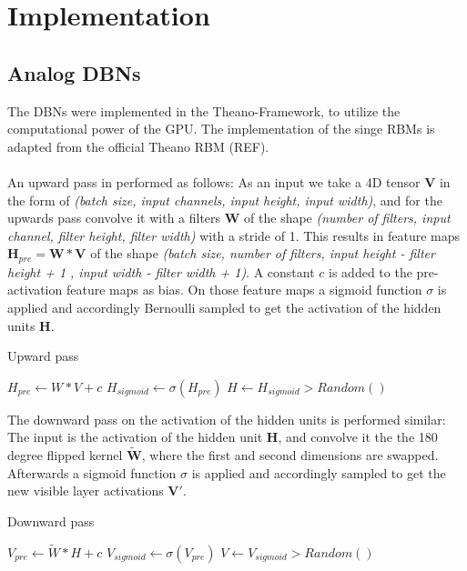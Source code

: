 \chapter{Implementation}


\section{Analog DBNs}

The DBNs were implemented in the Theano-Framework, to utilize the computational power of the GPU.
The implementation of the singe RBMs is adapted from the official Theano RBM (REF).
\\
\\
An upward pass in performed as follows:
As an input we take a 4D tensor $\textbf{V}$ in the form of \textit{(batch size, input channels, input height, input width)}, and for the upwards pass convolve it with a filters $\textbf{W}$ of the shape \textit{(number of filters, input channel, filter height, filter width)} with a stride of 1.
This results in feature maps $\textbf{H}_{pre} = \textbf{W} * \textbf{V}$ of the shape \textit{(batch size, number of filters, input height - filter height + 1 , input width - filter width + 1)}.
A constant $c$ is added to the pre-activation feature maps as bias.
On those feature maps a sigmoid function $\sigma$ is applied and accordingly Bernoulli sampled to get the activation of the hidden units $\textbf{H}$.

\begin{algorithm}
\caption{Upward pass}
\begin{algorithmic}
\State ${H}_{pre}\gets W * V + c $  
\State ${H}_{sigmoid} \gets \sigma({H}_{pre})$
\State $H \gets {H}_{sigmoid} > Random()$
\end{algorithmic}
\end{algorithm}


The downward pass on the activation of the hidden units is performed similar:
The input is the activation of the hidden unit $\textbf{H}$, and convolve it the the 180 degree flipped kernel $\tilde{\textbf{W}}$, where the first and second dimensions are swapped.
Afterwards a sigmoid function $\sigma$ is applied and accordingly sampled to get the new visible layer activations $\textbf{V}'$.

\begin{algorithm}
\caption{Downward pass}
\begin{algorithmic}
\State ${V}_{pre}\gets \tilde{W} * H + c $  
\State ${V}_{sigmoid} \gets \sigma({V}_{pre})$
\State $V \gets {V}_{sigmoid} > Random()$
\end{algorithmic}
\end{algorithm}

